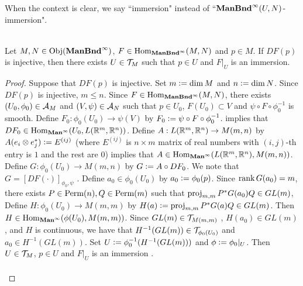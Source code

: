\documentclass{book}
\begin{document}
	\begin{note}
		When the context is clear, we say ``immersion" instead of ``$\operatorname*{\text{\textbf{ManBnd}}^{\infty}}(U,N)$-immersion".
	\end{note}

	\begin{ex}   \\
		Let $M, N \in \operatorname{Obj}(\operatorname*{\text{\textbf{ManBnd}}^{\infty}})$, $F \in \operatorname{Hom}_{\operatorname*{\text{\textbf{ManBnd}}^{\infty}}}(M, N)$ and $p \in M$. If $DF(p)$ is injective, then there exists $U \in \mathcal{T}_M$ such that $p \in U$ and $F|_U$ is an immersion. 
	\end{ex}

	\begin{proof}
		Suppose that $DF(p)$ is injective. Set $m \vcentcolon= \dim M$ and $n \vcentcolon= \dim N$. Since $DF(p)$ is injective, $m \leq n$. Since $F \in \operatorname{Hom}_{\operatorname*{\text{\textbf{ManBnd}}^{\infty}}}(M, N)$, there exists $(U_0, \phi_0) \in \mathcal{A}_M$ and $(V, \psi) \in \mathcal{A}_N$ such that $p \in U_0$, $F(U_0) \subset V$ and $\psi \circ F \circ \phi_0^{-1}$ is smooth. Define $F_0:\phi_0(U_0) \rightarrow \psi(V)$ by $F_0 \vcentcolon= \psi \circ F \circ \phi_0^{-1}$.  implies that $DF_0 \in \operatorname{Hom}_{\operatorname*{\text{\textbf{Man}}^{\infty}}}(U_0, L(\mathbb{R}^m, \mathbb{R}^n))$. Define $A: L(\mathbb{R}^m, \mathbb{R}^n) \rightarrow M(m, n)$  by $A(e_i \otimes e_j^*) \vcentcolon= E^{(ij)}$ (where $E^{(ij)}$ is $n \times m$ matrix of real numbers with $(i,j)$-th entry is $1$ and the rest are $0$)   implies that $A \in \operatorname{Hom}_{\operatorname*{\text{\textbf{Man}}^{\infty}}}(L(\mathbb{R}^m, \mathbb{R}^n), M(m, n))$. Define $G: \phi_0(U_0) \rightarrow M(m, n)$ by $G \vcentcolon= A \circ DF_0$. We note that $G = [DF(\cdot)]_{\phi_0, \psi}$ . Define $a_0 \in \phi_0(U_0)$ by $a_0 \vcentcolon= \phi_0(p)$. Since $\operatorname{\text{rank}} G(a_0) = m$, there exists $P \in \text{Perm}(n), Q \in \text{Perm}(m)$ such that $\operatorname{\text{proj}}_{m, m} P^* G(a_0) Q \in GL(m)$,  Define $H:\phi_0(U_0) \rightarrow M(m, m)$ by $H(a) \vcentcolon= \operatorname{\text{proj}}_{m, m} P^* G(a) Q \in GL(m)$. Then $H \in \operatorname{Hom}_{\operatorname*{\text{\textbf{Man}}^{\infty}}}(\phi(U_0), M(m,m))$. Since $GL(m) \in \mathcal{T}_{M(m,m)}$ , $H(a_0) \in GL(m)$, and $H$ is continuous, we have that $H^{-1}(GL(m)) \in \mathcal{T}_{\phi_0(U_0)}$ and $a_0 \in H^{-1}(GL(m))$. Set $U \vcentcolon= \phi_0^{-1}(H^{-1}(GL(m)))$ and $\phi \vcentcolon= \phi_0|_U$. Then $U \in \mathcal{T}_M$, $p \in U$ and $F|_U$ is an immersion .   
		\\
		\\
	\end{proof}
\end{document}
